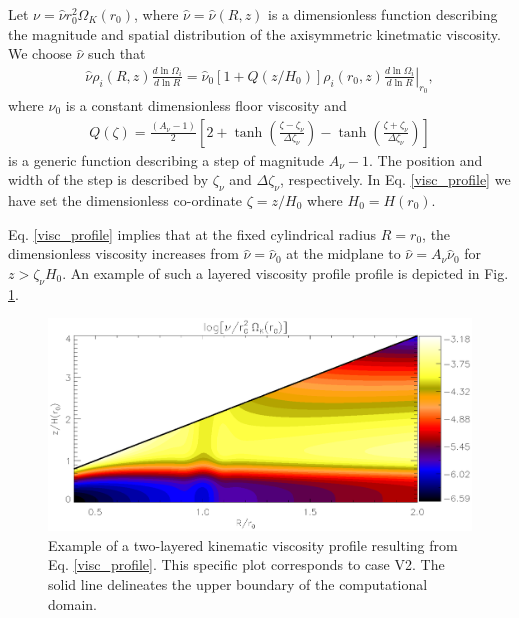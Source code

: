 Let $\nu = \hat{\nu}r_0^2\Omega_K(r_0)$, where
$\hat{\nu}=\hat{\nu}(R,z)$ is a dimensionless function describing
the magnitude and spatial distribution of the axisymmetric kinetmatic
viscosity. We choose $\hat{\nu}$ such that   
\begin{align}\label{visc_profile}
  \hat{\nu}\rho_i(R,z)\frac{d\ln{\Omega_i}}{d\ln{R}} =
  \hat{\nu}_0\left[1+Q(z/H_0)\right]\rho_i(r_0,z)\left.\frac{d\ln{\Omega_i}}{d\ln{R}}\right|_{r_0}, 
\end{align}
where $\nu_0$ is a constant dimensionless floor viscosity and   
\begin{align}\label{step}
  Q(\zeta) = \frac{\left(A_\nu - 1\right)}{2}
  \left[  2 + \tanh{\left(\frac{\zeta - \zeta_\nu}{\Delta\zeta_\nu}\right)}
    - \tanh{\left(\frac{\zeta +
        \zeta_\nu}{\Delta\zeta_\nu}\right)}\right]
\end{align}
is a generic function describing a step of magnitude
$A_\nu-1$. The position and width of the step is described by
$\zeta_\nu$ and $\Delta\zeta_\nu$, respectively. 
In Eq. \ref{visc_profile} we have set the dimensionless co-ordinate
$\zeta=z/H_0$ where $H_0=H(r_0)$.  

Eq. \ref{visc_profile} implies that at the fixed cylindrical radius
$R=r_0$, the dimensionless viscosity increases from $\hat{\nu} =
\hat{\nu}_0$ at the midplane to $\hat{\nu} = A_\nu\hat{\nu}_0$ for
$z > \zeta_\nu H_0$. An example of such a layered viscosity profile
profile is depicted in Fig. \ref{visc2d}. 

\begin{figure}
  \centering
  \includegraphics[width=\linewidth]{figures/pdisk_visc2d_layer2}
  \caption{Example of a two-layered kinematic viscosity profile
    resulting from Eq. \ref{visc_profile}. This specific plot
    corresponds to case V2. The solid line
    delineates the upper boundary of the computational domain.
    \label{visc2d}}
\end{figure}

